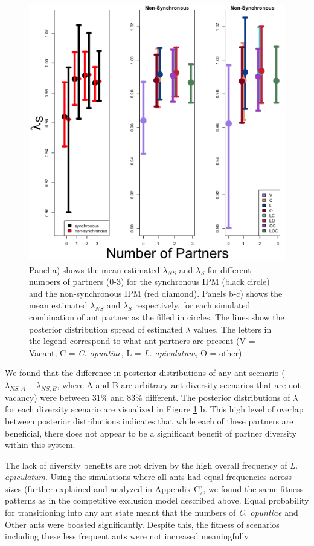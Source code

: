 \documentclass[11pt]{article}
\begin{document}
\begin{figure}
	\includegraphics[width=0.91\linewidth]{Figures/Lambdas_Comp_lines.png}
	\caption{Panel a) shows the mean estimated $\lambda_{NS}$ and $\lambda_{S}$ for different numbers of partners (0-3) for the synchronous IPM (black circle) and the non-synchronous IPM (red diamond). Panels b-c) shows the mean estimated $\lambda_{NS}$ and $\lambda_{S}$ respectively, for each simulated combination of ant partner as the filled in circles. The lines show the posterior distribution spread of estimated $\lambda$ values. The letters in the legend correspond to what ant partners are present (V = Vacant, C = \textit{C. opuntiae}, L = \textit{L. apiculatum}, O = other). }
	\label{fig:LambdaMeans}
\end{figure}

We found that the difference in posterior distributions of any ant scenario ($\lambda_{NS,A} - \lambda_{NS,B}$, where A and B are arbitrary ant diversity scenarios that are not vacancy) were between 31\% and 83\% different.
The posterior distributions of $\lambda$ for each diversity scenario are visualized in Figure \ref{fig:LambdaMeans} b.
This high level of overlap between posterior distributions indicates that while each of these partners are beneficial, there does not appear to be a significant benefit of partner diversity within this system.

The lack of diversity benefits are not driven by the high overall frequency of \textit{L. apiculatum}. 
Using the simulations where all ants had equal frequencies across sizes (further explained and analyzed in Appendix C), we found the same fitness patterns as in the competitive exclusion model described above.
Equal probability for transitioning into any ant state meant that the numbers of \textit{C. opuntiae} and Other ants were boosted significantly.
Despite this, the fitness of scenarios including these less frequent ants were not increased meaningfully.
\end{document}
